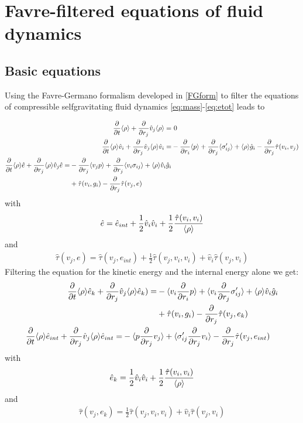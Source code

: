 \chapter{Favre-filtered equations of fluid dynamics}\label{FE}
\section{Basic equations}
Using the Favre-Germano formalism developed in \ref{FGform} to filter the
equations of compressible selfgravitating fluid dynamics
\eqref{eq:mass}-\eqref{eq:etot} leads to

\begin{align}
\frac{\partial}{\partial t}\langle \rho \rangle + \frac{\partial}{\partial r_j}\hat{v}_j\langle \rho \rangle =&\ 0 \label{eq:film}\\
\frac{\partial}{\partial t}\langle \rho \rangle\hat{v}_i + \frac{\partial}{\partial r_j}\hat{v}_j\langle \rho \rangle\hat{v}_i =&
-\frac{\partial}{\partial r_i}\langle p \rangle+\frac{\partial}{\partial r_j}\langle \sigma'_{ij} \rangle+\langle \rho \rangle\hat{g}_i
-\frac{\partial}{\partial r_j}\hat{\tau}(v_i,v_j) \label{eq:filmom}
\\
\begin{split}
\frac{\partial}{\partial t}\langle \rho \rangle\hat{e}+\frac{\partial}{\partial r_j}\langle \rho \rangle\hat{v}_j\hat{e} =&
-\frac{\partial}{\partial r_j}\langle v_j p \rangle+\frac{\partial}{\partial r_j}\langle v_i \sigma_{ij} \rangle
+\langle \rho \rangle\hat{v}_i\hat{g}_i\\
&+\hat{\tau}(v_i,g_i)-\frac{\partial}{\partial r_j}\hat{\tau}(v_j,e)
\end{split}
\end{align}
with
\begin{align}
\hat{e}=\hat{e}_{int}+\frac{1}{2}\hat{v}_i\hat{v}_i
+\frac{1}{2}\frac{\hat{\tau}(v_i,v_i)}{\langle \rho \rangle}
\end{align}
and
\begin{align}
\hat{\tau}(v_j,e)=\hat{\tau}(v_j,e_{int})+\frac{1}{2}\hat{\tau}(v_j,v_i,v_i)
+\hat{v}_i\hat{\tau}(v_j,v_i)
\end{align}
Filtering the equation for the kinetic energy and the internal energy alone we
get:
\begin{align}
\begin{split}
\frac{\partial}{\partial t}\langle \rho \rangle \hat{e}_k+\frac{\partial}{\partial r_j}\hat{v}_j \langle \rho \rangle \hat{e}_k) =& 
-\langle v_i \frac{\partial}{\partial r_i}p \rangle+\langle v_i \frac{\partial}{\partial r_j}\sigma'_{ij} \rangle
+\langle \rho \rangle \hat{v}_i \hat{g}_i\\
&+\hat{\tau}(v_i,g_i)-\frac{\partial}{\partial r_j}\hat{\tau}(v_j,e_k) \label{eq:filkin}
\end{split}
\\
\begin{split}
\frac{\partial}{\partial t}\langle \rho \rangle \hat{e}_{int}+\frac{\partial}{\partial r_j}\hat{v}_j \langle \rho \rangle \hat{e}_{int} =&
-\langle p \frac{\partial}{\partial r_j}v_j \rangle + \langle \sigma'_{ij}\frac{\partial}{\partial r_j}v_i \rangle
-\frac{\partial}{\partial r_j}\hat{\tau}(v_j,e_{int})\label{eq:filint}
\end{split}
\end{align}
with
\begin{align}
\hat{e}_k=\frac{1}{2}\hat{v}_i\hat{v}_i
+\frac{1}{2}\frac{\hat{\tau}(v_i,v_i)}{\langle \rho \rangle}
\end{align}
and
\begin{align}
\hat{\tau}(v_j,e_k)=\frac{1}{2}\hat{\tau}(v_j,v_i,v_i)+\hat{v}_i\hat{\tau}(v_j,
v_i)
\end{align}
